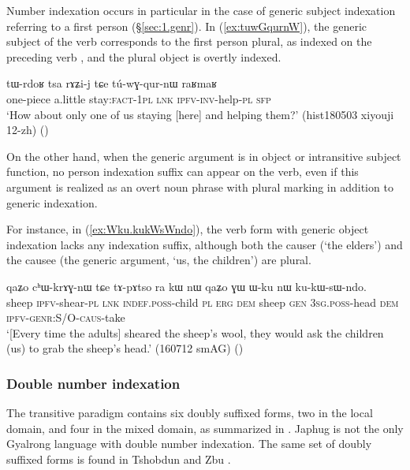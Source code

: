 Number indexation occurs in particular in the case of generic subject indexation referring to a first person (§\ref{sec:1.genr}). In (\ref{ex:tuwGqurnW}), the generic subject of the verb  corresponds to the first person plural, as indexed on the preceding verb , and the plural object is overtly indexed.

\begin{exe}
\ex \label{ex:tuwGqurnW}
\gll tɯ-rdoʁ tsa rɤʑi-j tɕe tú-wɣ-qur-nɯ raʁmaʁ \\
one-piece a.little stay:\textsc{fact}-\textsc{1pl} \textsc{lnk} \textsc{ipfv}-\textsc{inv}-help-\textsc{pl} \textsc{sfp} \\
\glt `How about only one of us staying [here] and helping them?' (hist180503 xiyouji 12-zh)
()
\end{exe}

On the other hand, when the generic argument is in object or intransitive subject function, no person indexation suffix can appear on the verb, even if this argument is realized as an overt noun phrase with plural marking in addition to generic indexation.

For instance, in (\ref{ex:Wku.kukWsWndo}), the verb form with generic object indexation  lacks any indexation suffix, although both the causer (`the elders') and the causee (the generic argument,  `us, the children') are plural.

\begin{exe}
\ex \label{ex:Wku.kukWsWndo}
\gll qaʑo cʰɯ-krɤɣ-nɯ tɕe tɤ-pɤtso ra kɯ nɯ qaʑo ɣɯ ɯ-ku nɯ ku-kɯ-sɯ-ndo. \\
sheep \textsc{ipfv}-shear-\textsc{pl} \textsc{lnk} \textsc{indef}.\textsc{poss}-child \textsc{pl} \textsc{erg} \textsc{dem} sheep \textsc{gen} \textsc{3sg}.\textsc{poss}-head \textsc{dem} \textsc{ipfv}-\textsc{genr}:S/O-\textsc{caus}-take \\
\glt `[Every time the adults] sheared the sheep's wool, they would ask the children (us) to grab the sheep's head.' (160712 smAG)
()
\end{exe}

\subsubsection{Double number indexation}  \label{sec:double.number.indexation}
The transitive paradigm contains six doubly suffixed forms, two in the local domain, and four in the mixed domain, as summarized in . Japhug is not the only Gyalrong language with double number indexation. The same set of doubly suffixed forms is found in Tshobdun \citep{jackson02rentongdengdi} and Zbu \citep{gongxun14agreement}.

